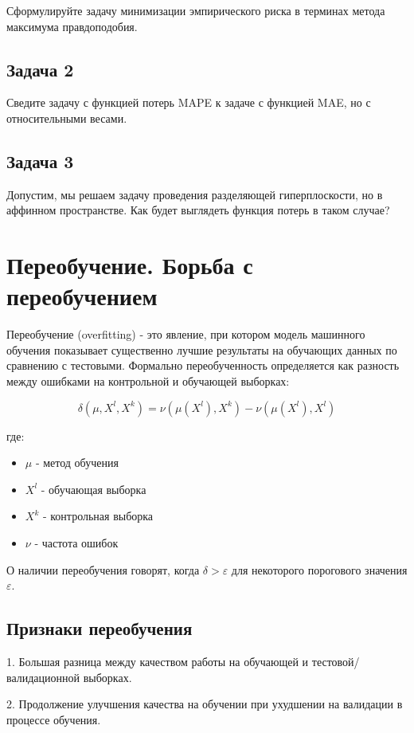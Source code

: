     Сформулируйте задачу минимизации эмпирического риска в терминах метода максимума правдоподобия.

\subsection*{Задача 2}

    Сведите задачу с функцией потерь MAPE к задаче с функцией MAE, но с относительными весами.
    
\subsection*{Задача 3}
    Допустим, мы решаем задачу проведения разделяющей гиперплоскости, но в аффинном пространстве. Как будет выглядеть функция потерь в таком случае?


\section*{Переобучение. Борьба с переобучением}

Переобучение (overfitting) - это явление, при котором модель машинного обучения показывает существенно лучшие результаты на обучающих данных по сравнению с тестовыми. Формально переобученность определяется как разность между ошибками на контрольной и обучающей выборках:

\[\delta(\mu, X^l, X^k) = \nu(\mu(X^l), X^k) - \nu(\mu(X^l), X^l)\]

где:
\begin{itemize}
   \item $\mu$ - метод обучения
   \item $X^l$ - обучающая выборка
   \item $X^k$ - контрольная выборка  
   \item $\nu$ - частота ошибок
\end{itemize}

О наличии переобучения говорят, когда $\delta > \varepsilon$ для некоторого порогового значения $\varepsilon$.

\subsection*{Признаки переобучения}

1. Большая разница между качеством работы на обучающей и тестовой/валидационной выборках.

2. Продолжение улучшения качества на обучении при ухудшении на валидации в процессе обучения.

